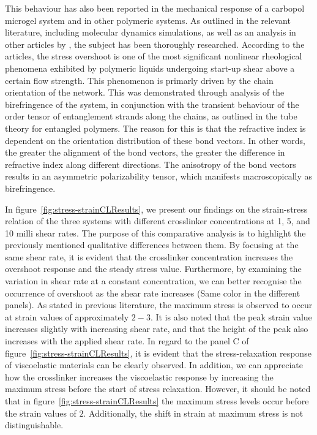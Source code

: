 This behaviour has also been reported in the mechanical response of a carbopol microgel system\citep{divouxStressOvershootSimple2011} and in other polymeric systems\citep{osakiStressOvershootPolymer2000a,ravindranathUniversalScalingCharacteristics2008,boukanyUniversalScalingBehavior2009}.
As outlined in the relevant literature, including molecular dynamics simulations\citep{jeongEffectChainOrientation2017,caoSimulatingStartupShear2015,mohagheghiMolecularlyBasedCriteria2016,baigFlowEffectsMelt2010a}, as well as an analysis in other articles by \citep{wangExploringStressOvershoot2009}, the subject has been thoroughly researched.
According to the articles\citep{jeongEffectChainOrientation2017,janeschitz-krieglPolymerMeltRheology1983,pearsonFlowInducedBirefringenceConcentrated1989,masubuchiPrimitiveChainNetwork2020}, the stress overshoot is one of the most significant nonlinear rheological phenomena exhibited by polymeric liquids undergoing start-up shear above a certain flow strength.
This phenomenon is primarly driven by the chain orientation of the network.
This was demonstrated through analysis of the birefringence of the system, in conjunction with the transient behaviour of the order tensor of entanglement strands along the chains, as outlined in the tube theory for entangled polymers.
The reason for this is that the refractive index is dependent on the orientation distribution of these bond vectors. 
In other words, the greater the alignment of the bond vectors, the greater the difference in refractive index along different directions. 
The anisotropy of the bond vectors results in an asymmetric polarizability tensor, which manifests macroscopically as birefringence.

In figure~\ref{fig:stress-strainCLResults}, we present our findings on the strain-stress relation of the three systems with different crosslinker concentrations at \num{1}, \num{5}, and \num{10} milli shear rates.
The purpose of this comparative analysis is to highlight the previously mentioned qualitative differences between them.
By focusing at the same shear rate, it is evident that the crosslinker concentration increases the overshoot response and the steady stress value.
Furthermore, by examining the variation in shear rate at a constant concentration, we can better recognise the occurrence of overshoot as the shear rate increases (Same color in the different panels).
As stated in previous literature, the maximum stress is observed to occur at strain values of approximately $2-3$.
It is also noted that the peak strain value increases slightly with increasing shear rate, and that the height of the peak also increases with the applied shear rate.
In regard to the panel C of figure~\ref{fig:stress-strainCLResults}, it is evident that the stress-relaxation response of viscoelastic materials can be clearly observed.
In addition, we can appreciate how the crosslinker increases the viscoelastic response by increasing the maximum stress before the start of stress relaxation.
However, it should be noted that in figure~\ref{fig:stress-strainCLResults} the maximum stress levels occur before the strain values of $2$. 
Additionally, the shift in strain at maximum stress is not distinguishable.


